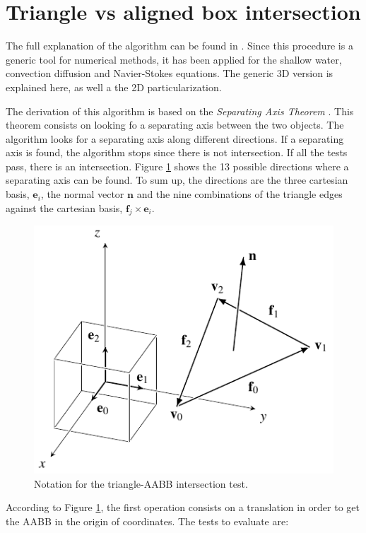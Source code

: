 \section{Triangle vs aligned box intersection}

The full explanation of the algorithm can be found in \cite{moller2004}. Since this procedure is a generic tool for numerical methods, it has been applied for the shallow water, convection diffusion and Navier-Stokes equations. The generic 3D version is explained here, as well a the 2D particularization.

The derivation of this algorithm is based on the \emph{Separating Axis Theorem} \cite{gottschalk1996}. This theorem consists on looking fo a separating axis between the two objects. 
The algorithm looks for a separating axis along different directions. If a separating axis is found, the algorithm stops since there is not intersection. If all the tests pass, there is an intersection.
Figure \ref{triangle_aabb} shows the 13 possible directions where a separating axis can be found. To sum up, the directions are the three cartesian basis, $\mathbf{e}_i$, the normal vector $\mathbf{n}$ and the nine combinations of the triangle edges against the cartesian basis, $\mathbf{f}_j \times \mathbf{e}_i$.

\begin{figure}
    \centering
    \includegraphics[width=.6\textwidth]{img/search/triangle_aabb.pdf}
    \caption{Notation for the triangle-AABB intersection test.}
    \label{triangle_aabb}
\end{figure}

According to Figure \ref{triangle_aabb}, the first operation consists on a translation in order to get the AABB in the origin of coordinates. The tests to evaluate are:


